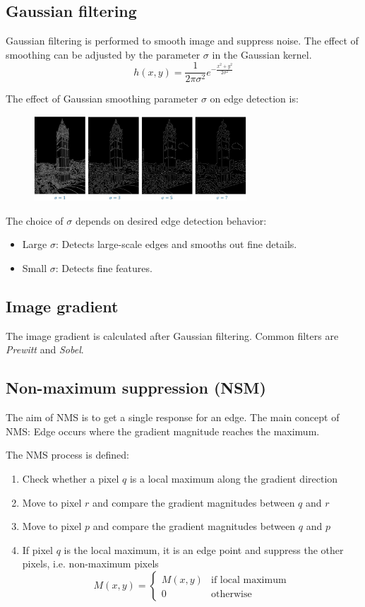 \documentclass{report}
\begin{document}
\subsection{Gaussian filtering}

Gaussian filtering is performed to smooth image and suppress noise. The effect
of smoothing can be adjusted by the parameter $\sigma$ in the Gaussian kernel.
$$
    h(x,y) = \frac{1}{2\pi \sigma^2} e^{-\frac{x^2 + y^2}{2\sigma^2}}
$$

The effect of Gaussian smoothing parameter $\sigma$ on edge detection is:
\begin{figure}[h]
    \centering
    \includegraphics[width=8cm]{Gaussian smoothing.JPG}
\end{figure}

The choice of $\sigma$ depends on desired edge detection behavior:
\begin{itemize}
    \item Large $\sigma$: Detects large-scale edges and smooths out fine details.
    \item Small $\sigma$: Detects fine features.
\end{itemize}

\subsection{Image gradient}

The image gradient is calculated after Gaussian filtering. Common filters are
\textit{Prewitt} and \textit{Sobel}.

\subsection{Non-maximum suppression (NSM)}

The aim of NMS is to get a single response for an edge. The main concept of NMS:
Edge occurs where the gradient magnitude reaches the maximum. 

The NMS process is defined:
\begin{enumerate}
    \item Check whether a pixel $q$ is a local maximum along the gradient direction
    \item Move to pixel $r$ and compare the gradient magnitudes between $q$ and $r$
    \item Move to pixel $p$ and compare the gradient magnitudes between $q$ and $p$
    \item If pixel $q$ is the local maximum, it is an edge point and suppress
    the other pixels, i.e. non-maximum pixels
    $$
        M(x,y) = \begin{cases}
            M(x,y) & \text{if local maximum} \\
            0 & \text{otherwise}
        \end{cases}
    $$
\end{enumerate}
\end{document}
